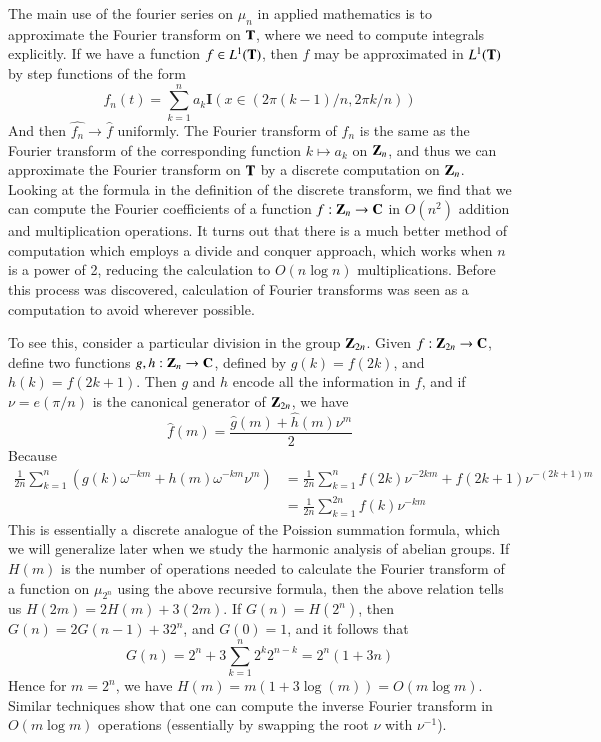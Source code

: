 The main use of the fourier series on $\mu_n$ in applied mathematics is to approximate the Fourier transform on $\operatorname{\mathbf{T}}$, where we need to compute integrals explicitly. If we have a function $f \in L^1(\operatorname{\mathbf{T}})$, then $f$ may be approximated in $L^1(\operatorname{\mathbf{T}})$ by step functions of the form
%
\[ f_n(t) = \sum_{k = 1}^{n} a_k \mathbf{I}(x \in (2 \pi (k-1) / n, 2 \pi k / n)) \]
%
And then $\widehat{f_n} \to \widehat{f}$ uniformly. The Fourier transform of $f_n$ is the same as the Fourier transform of the corresponding function $k \mapsto a_k$ on $\operatorname{\mathbf{Z}}_n$, and thus we can approximate the Fourier transform on $\operatorname{\mathbf{T}}$ by a discrete computation on $\operatorname{\mathbf{Z}}_n$. Looking at the formula in the definition of the discrete transform, we find that we can compute the Fourier coefficients of a function $f: \operatorname{\mathbf{Z}}_n \to \operatorname{\mathbf{C}}$ in $O(n^2)$ addition and multiplication operations. It turns out that there is a much better method of computation which employs a divide and conquer approach, which works when $n$ is a power of 2, reducing the calculation to $O(n \log n)$ multiplications. Before this process was discovered, calculation of Fourier transforms was seen as a computation to avoid wherever possible.

To see this, consider a particular division in the group $\operatorname{\mathbf{Z}}_{2n}$. Given $f: \operatorname{\mathbf{Z}}_{2n} \to \operatorname{\mathbf{C}}$, define two functions $g,h: \operatorname{\mathbf{Z}}_n \to \operatorname{\mathbf{C}}$, defined by $g(k) = f(2k)$, and $h(k) = f(2k + 1)$. Then $g$ and $h$ encode all the information in $f$, and if $\nu = e(\pi/n)$ is the canonical generator of $\operatorname{\mathbf{Z}}_{2n}$, we have
%
\[ \hat{f}(m) = \frac{\hat{g}(m) + \hat{h}(m) \nu^m}{2} \]
%
Because
%
\begin{align*}
    \frac{1}{2n} \sum_{k = 1}^{n} \left( g(k) \omega^{-km} + h(m) \omega^{-km} \nu^m \right) &= \frac{1}{2n} \sum_{k = 1}^n f(2k) \nu^{-2km} + f(2k + 1) \nu^{-(2k+1)m}\\
    &= \frac{1}{2n} \sum_{k = 1}^{2n} f(k) \nu^{-km}
\end{align*}
%
This is essentially a discrete analogue of the Poission summation formula, which we will generalize later when we study the harmonic analysis of abelian groups. If $H(m)$ is the number of operations needed to calculate the Fourier transform of a function on $\mu_{2^n}$ using the above recursive formula, then the above relation tells us $H(2m) = 2H(m) + 3 (2m)$. If $G(n) = H(2^n)$, then $G(n) = 2G(n-1) + 3 2^n$, and $G(0) = 1$, and it follows that
%
\[ G(n) = 2^n + 3 \sum_{k = 1}^n 2^{k} 2^{n-k} = 2^n(1 + 3n) \]
%
Hence for $m = 2^n$, we have $H(m) = m(1 + 3 \log (m)) = O(m \log m)$. Similar techniques show that one can compute the inverse Fourier transform in $O(m \log m)$ operations (essentially by swapping the root $\nu$ with $\nu^{-1}$).

